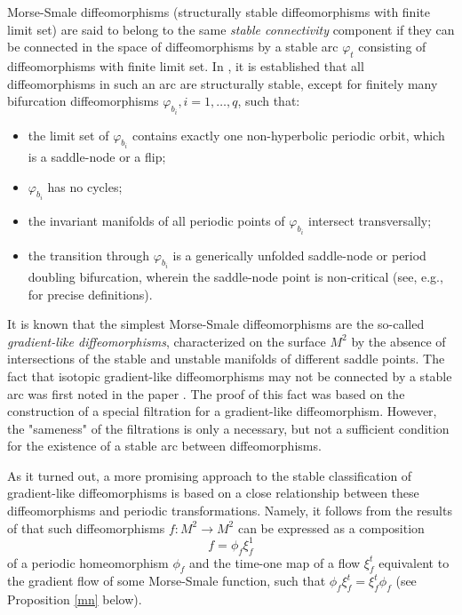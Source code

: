 \documentclass{amsart}
\numberwithin{equation}{section}
\begin{document}
	Morse-Smale diffeomorphisms (structurally stable diffeomorphisms with finite limit set) are said to belong to the same {\it stable connectivity} component if they can be connected in the space of diffeomorphisms by a stable arc $\varphi_t$ consisting of diffeomorphisms with finite limit set. In \cite{NPT}, it is established that all diffeomorphisms in such an arc are structurally stable, except for finitely many bifurcation diffeomorphisms $\varphi_{b_i}, i=1,\dots,q$, such that:
	\begin{itemize}
		\item[1)] the limit set of $\varphi_{b_i}$ contains exactly one non-hyperbolic periodic orbit, which is a saddle-node or a flip;
		\item[2)] $\varphi_{b_i}$ has no cycles;
		\item[3)] the invariant manifolds of all periodic points of $\varphi_{b_i}$ intersect transversally;
		\item[4)] the transition through $\varphi_{b_i}$ is a generically unfolded saddle-node or period doubling bifurcation, wherein the saddle-node point is non-critical (see, e.g., \cite{medved} for precise definitions).
	\end{itemize}	
	
	
	It is known that the simplest Morse-Smale diffeomorphisms are the so-called {\it gradient-like diffeomorphisms}, characterized on the surface $M^2$ by the absence of intersections of the stable and unstable manifolds of different saddle points. The fact that isotopic gradient-like diffeomorphisms may not be connected by a stable arc was first noted in the paper \cite{blan}. The proof of this fact was based on the construction of a special filtration for a gradient-like diffeomorphism. However, the "sameness" of the filtrations is only a necessary, but not a sufficient condition for the existence of a stable arc between diffeomorphisms.
	
	
	
	As it turned out, a more promising approach to the stable classification of gradient-like diffeomorphisms is based on a close relationship between these diffeomorphisms and periodic transformations. Namely, it follows from the results of \cite{treh} that such diffeomorphisms $f:M^2\to M^2$ can be expressed as a composition
	\begin{equation}\label{comp}
		f = \phi_f \xi^1_f
	\end{equation} 
	of a periodic homeomorphism $\phi_f$ and the time-one map of a flow $\xi^t_f$ equivalent to the gradient flow of some Morse-Smale function, such that $\phi_f \xi^t_f = \xi^t_f \phi_f$ (see Proposition \ref{mn} below).  
	
\end{document}
